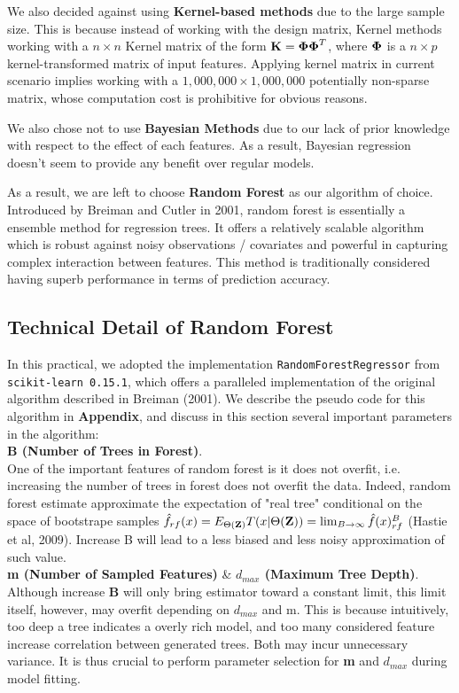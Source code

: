 \documentclass[11pt]{article}
\theoremstyle{definition}
\begin{document}
We also decided against using \textbf{Kernel-based methods} due to the large sample size. This is because instead of working with the design matrix, Kernel methods working with a $n \times n$ Kernel matrix of the form ${\bf K} = \boldsymbol{\Phi} \boldsymbol{\Phi}^T$, where $\boldsymbol{\Phi}$ is a $n \times p$ kernel-transformed matrix of input features. Applying kernel matrix in current scenario implies working with a $1,000,000 \times 1,000,000$ potentially non-sparse matrix, whose computation cost is prohibitive for obvious reasons. 

We also chose not to use \textbf{Bayesian Methods} due to our lack of prior knowledge with respect to the effect of each features. As a result, Bayesian regression doesn't seem to provide any benefit over regular models.

As a result, we are left to choose \textbf{Random Forest} as our algorithm of choice. Introduced by Breiman and Cutler in 2001, random forest is essentially a ensemble method for regression trees. It offers a relatively  scalable algorithm which is robust against noisy observations / covariates and powerful in capturing complex interaction between features. This method is traditionally considered having superb performance in terms of prediction accuracy.

\subsection{\textbf{Technical Detail of Random Forest}}
In this practical, we adopted the implementation {\tt RandomForestRegressor} from {\tt scikit-learn 0.15.1}, which offers a paralleled implementation of the original algorithm described in Breiman (2001). We describe the pseudo code for this algorithm in \textbf{Appendix}, and discuss in this section several important parameters in the algorithm:\\

\textbf{B (Number of Trees in Forest)}. \\
One of the important features of random forest is it does not overfit, i.e. increasing the number of trees in forest does not overfit the data. Indeed, random forest estimate approximate the expectation of "real tree" conditional on the space of bootstrape samples $\hat{f}_{rf}(x) = E_{\Theta({\bf Z})}T(x|\Theta({\bf Z})) = \lim_{B \rightarrow \infty} \hat{f}(x)_{rf}^B$ (Hastie et al, 2009). Increase B will lead to a less biased and less noisy approximation of such value.\\

\textbf{m (Number of Sampled Features)} \& \textbf{$d_{max}$ (Maximum Tree Depth)}. \\
Although increase \textbf{B} will only bring estimator toward a constant limit, this limit itself, however, may overfit depending on $d_{max}$ and m. This is because intuitively, too deep a tree indicates a overly rich model, and too many considered feature increase correlation between generated trees. Both may incur unnecessary variance. It is thus crucial to perform parameter selection for \textbf{m} and \textbf{$d_{max}$} during model fitting.
\end{document}
